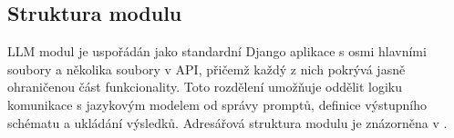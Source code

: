 \subsection{Struktura modulu}
\label{subsec:implementation-module}

LLM modul je uspořádán jako standardní Django aplikace s osmi hlavními soubory a několika soubory v API, přičemž každý z nich pokrývá jasně ohraničenou část funkcionality.
Toto rozdělení umožňuje oddělit logiku komunikace s jazykovým modelem od správy promptů, definice výstupního schématu a ukládání výsledků.
Adresářová struktura modulu je znázorněna v .

\begin{listing}[ht]
    \inputminted{awk}{resources/sources/file-structure.txt}
    \caption{Struktura adresářů a souborů implementace}
    \label{lst:implementation-structure}
\end{listing}

\endinput